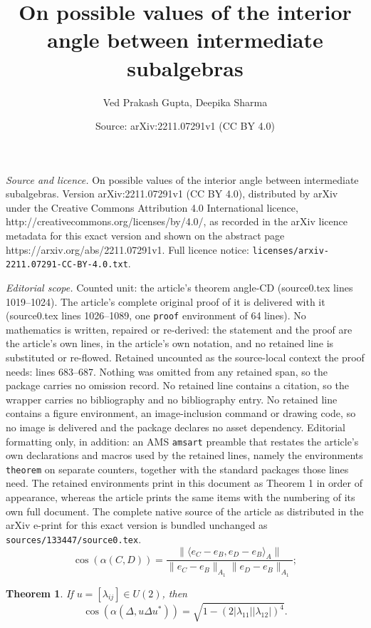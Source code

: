 \documentclass[10pt,a4paper]{amsart}
\title{On possible values of the interior angle between intermediate subalgebras}
\author{Ved Prakash Gupta, Deepika Sharma}
\date{Source: arXiv:2211.07291v1 (CC BY 4.0)}
\newtheorem{theorem}{Theorem}
\begin{document}
\maketitle

\noindent\emph{Source and licence.} On possible values of the interior angle between intermediate subalgebras. Version arXiv:2211.07291v1 (CC BY 4.0), distributed by arXiv under the Creative Commons Attribution 4.0 International licence, http://creativecommons.org/licenses/by/4.0/, as recorded in the arXiv licence metadata for this exact version and shown on the abstract page https://arxiv.org/abs/2211.07291v1. Full licence notice: \texttt{licenses/arxiv-2211.07291-CC-BY-4.0.txt}.\par\smallskip

\noindent\textit{Editorial scope.} Counted unit: the article's theorem angle-CD (source0.tex lines 1019--1024). The article's complete original proof of it is delivered with it (source0.tex lines 1026--1089, one \texttt{proof} environment of 64 lines). No mathematics is written, repaired or re-derived: the statement and the proof are the article's own lines, in the article's own notation, and no retained line is substituted or re-flowed.  Retained uncounted as the source-local context the proof needs: lines 683--687.  Nothing was omitted from any retained span, so the package carries no omission record.  No retained line contains a citation, so the wrapper carries no bibliography and no bibliography entry.  No retained line contains a figure environment, an image-inclusion command or drawing code, so no image is delivered and the package declares no asset dependency.  Editorial formatting only, in addition: an AMS \texttt{amsart} preamble that restates the article's own declarations and macros used by the retained lines, namely the environments \texttt{theorem} on separate counters, together with the standard packages those lines need.  The retained environments print in this document as Theorem 1 in order of appearance, whereas the article prints the same items with the numbering of its own full document.  The complete native source of the article as distributed in the arXiv e-print for this exact version is bundled unchanged as \texttt{sources/133447/source0.tex}.
     \begin{equation}\label{angle-int}
   \cos(\alpha(C,D)) = \frac{\|\langle e_C - e_B, e_D - e_B
     \rangle_{A} \|}{\| e_C - e_B\|_{A_1} \| e_D -
     e_B\|_{A_1}};
     \end{equation}

\begin{theorem}\label{angle-CD}
  If $u = [ \lambda_{ij}]\in U(2)$, then
\begin{equation}
\cos(\alpha(\Delta, u \Delta u^*)) = \sqrt{1-(2 |\lambda_{11}| |\lambda_{12}|)^4}.
\end{equation}
  \end{theorem}
\end{document}

